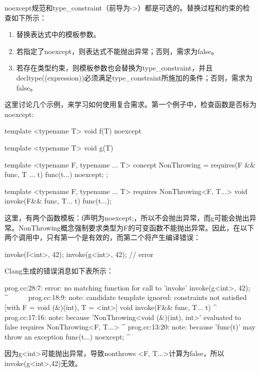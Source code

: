 noexcept规范和type_constraint（前导为->）都是可选的。替换过程和约束的检查如下所示：

\begin{enumerate}
  \item 替换表达式中的模板参数。
  \item 若指定了noexcept，则表达式不能抛出异常；否则，需求为false。
  \item 若存在类型约束，则模板参数也会替换为type_constraint，并且decltype((expression))必须满足type_constraint所施加的条件；否则，需求为false。
\end{enumerate}

这里讨论几个示例，来学习如何使用复合需求。第一个例子中，检查函数是否标为noexcept:

\begin{cppcode}
template <typename T>
void f(T) noexcept {}

template <typename T>
void g(T) {}

template <typename F, typename ... T>
concept NonThrowing = requires(F && func, T ... t)
{
	{func(t...)} noexcept;
};

template <typename F, typename ... T>
	requires NonThrowing<F, T...>
void invoke(F&& func, T... t)
{
	func(t...);
}
\end{cppcode}

这里，有两个函数模板：f声明为noexcept;，所以不会抛出异常，而g可能会抛出异常。NonThrowing概念强制要求类型为F的可变函数不能抛出异常。因此，在以下两个调用中，只有第一个是有效的，而第二个将产生编译错误：

\begin{cppcode}
invoke(f<int>, 42);
invoke(g<int>, 42); // error
\end{cppcode}

Clang生成的错误消息如下表所示：

\begin{shell}
prog.cc:28:7: error: no matching function for call to 'invoke'
      invoke(g<int>, 42);
       ^~~~~~
prog.cc:18:9: note: candidate template ignored: constraints not
satisfied [with F = void (&)(int), T = <int>]
   void invoke(F&& func, T... t)
          ^
prog.cc:17:16: note: because 'NonThrowing<void (&)(int), int>'
evaluated to false
      requires NonThrowing<F, T...>
                  ^
prog.cc:13:20: note: because 'func(t)' may throw an exception
      {func(t...)} noexcept;
                       ^
\end{shell}

因为g<int>可能抛出异常，导致nonthrows <F, T...>计算为false，所以invoke(g<int>,42)无效。

